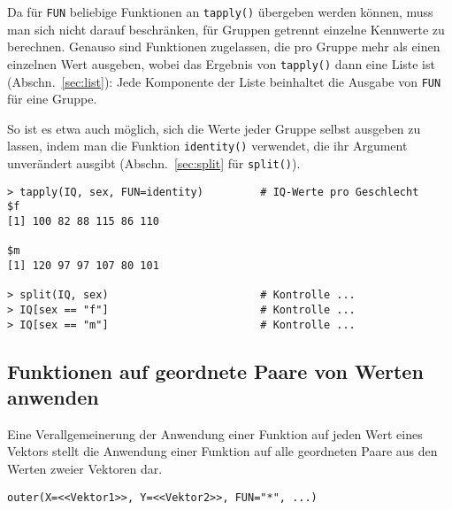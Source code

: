 Da für \lstinline!FUN! beliebige Funktionen an \lstinline!tapply()! übergeben werden können, muss man sich nicht darauf beschränken, für Gruppen getrennt einzelne Kennwerte zu berechnen. Genauso sind Funktionen zugelassen, die pro Gruppe mehr als einen einzelnen Wert ausgeben, wobei das Ergebnis von \lstinline!tapply()! dann eine Liste ist (Abschn.\ \ref{sec:list}): Jede Komponente der Liste beinhaltet die Ausgabe von \lstinline!FUN! für eine Gruppe.

So ist es etwa auch möglich, sich die Werte jeder Gruppe selbst ausgeben zu lassen, indem man die Funktion \lstinline!identity()! verwendet, die ihr Argument unverändert ausgibt (Abschn.\ \ref{sec:split} für \lstinline!split()!).
\begin{lstlisting}
> tapply(IQ, sex, FUN=identity)         # IQ-Werte pro Geschlecht
$f
[1] 100 82 88 115 86 110

$m
[1] 120 97 97 107 80 101

> split(IQ, sex)                        # Kontrolle ...
> IQ[sex == "f"]                        # Kontrolle ...
> IQ[sex == "m"]                        # Kontrolle ...
\end{lstlisting}

\subsection{Funktionen auf geordnete Paare von Werten anwenden}

Eine Verallgemeinerung der Anwendung einer Funktion auf jeden Wert eines Vektors stellt die Anwendung einer Funktion auf alle geordneten Paare aus den Werten zweier Vektoren dar.
\begin{lstlisting}
outer(X=<<Vektor1>>, Y=<<Vektor2>>, FUN="*", ...)
\end{lstlisting}

